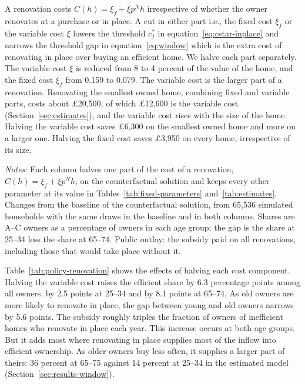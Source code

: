 A renovation costs $C(h)=\xi_f+\xi p^N h$
irrespective of whether the owner renovates at a
purchase or in place. A cut in either part i.e., the fixed cost $\xi_f$ or the variable cost $\xi$ lowers the threshold $c_j^*$ in
equation~\eqref{eq:cstar-inplace} and narrows the threshold gap in
equation~\eqref{eq:window} which is the extra cost of renovating in place over
buying an efficient home. We halve each part separately. The variable cost
$\xi$ is reduced from 8 to 4 percent of the value of the home, and the fixed cost
$\xi_f$ from 0.159 to 0.079. The variable cost is the larger part of a
renovation. Renovating the smallest owned home, combining fixed and variable parts, costs about \pounds20,500,
of which \pounds12,600 is the variable cost (Section~\ref{sec:estimates}),
and the variable cost rises with the size of the home. Halving the variable cost saves
\pounds6,300 on the smallest owned home and more on a larger one. Halving
the fixed cost saves \pounds3,950 on every home, irrespective of its size.



\begin{table}[t]
  \centering
  \caption[Lowering the cost of renovating in place]{{Lowering the
  cost of renovating in place}}\label{tab:policy-renovation}
  \begin{threeparttable}
    \small
    \begin{tablenotes}[flushleft]\footnotesize
      \item {\textit{Notes:} Each column halves one part of the cost
      of a renovation, $C(h)=\xi_f+\xi p^N h$, on the counterfactual
      solution and keeps every other parameter at its value in
      Tables~\ref{tab:fixed-parameters} and~\ref{tab:estimates}. Changes
      from the baseline of the counterfactual solution, from 65,536
      simulated households with the same draws in the baseline and in both
      columns. Shares are A--C owners as a percentage of owners in each age
      group; the gap is the share at 25--34 less the share at 65--74.
      Public outlay: the subsidy paid on all renovations, including those
      that would take place without it. }
    \end{tablenotes}
  \end{threeparttable}
\end{table}


Table~\ref{tab:policy-renovation} shows the effects of halving each cost component. Halving the variable cost raises the efficient share by 6.3 percentage
points among all owners, by 2.5 points at 25--34 and by 8.1 points at
65--74. As old owners are more likely to renovate in place, the gap between young and old owners narrows by 5.6 points. The subsidy roughly
triples the fraction of owners of inefficient homes who renovate in place
each year. This increase occurs at both age groups. But it adds most where renovating in place
supplies most of the inflow into efficient ownership. As older owners
buy less often, it supplies a larger part of theirs: 36 percent at 65--75
against 14 percent at 25--34 in the estimated model
(Section~\ref{sec:results-window}). 

